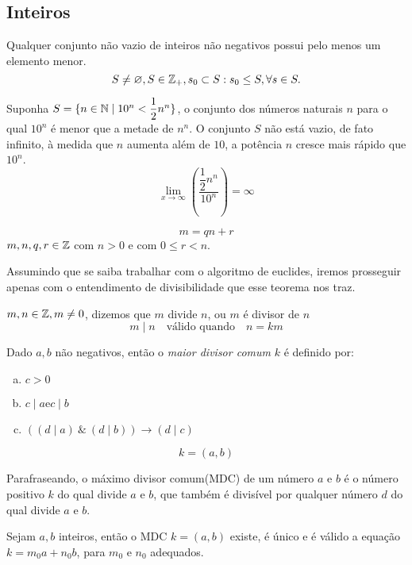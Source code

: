 \subsection{Inteiros}
\begin{definition}\label{PBO}
    Qualquer conjunto não vazio de inteiros não negativos possui  pelo menos um elemento menor.
    $$S\neq \varnothing, S \in \mathbb{Z}_+, s_{0} \subset S: s_{0} \leq S, \forall s \in S.$$
\begin{exmp}
    Suponha $S = \{n \in \mathbb{N} \mid 10^n < \dfrac{1}{2} n^n \}$, o conjunto dos números naturais $n$ para o qual $10^n$ é menor que a metade de $n^n$. O conjunto $S$ não está vazio, de fato infinito, à medida que $n$ aumenta além de $10$, a potência $n$ cresce mais rápido que $10^n$. $$ \lim_{x \to \infty}\left(\dfrac{\dfrac{1}{2} n^n}{10^n}\right) = \infty $$
\end{exmp}
\end{definition}
\begin{theorem}
    $$m = qn + r$$
    $m, n, q, r \in \mathbb{Z}$ com $n > 0$ e com $0 \leq r < n$.
\end{theorem}
Assumindo que se saiba trabalhar com o algoritmo de euclides, iremos prosseguir apenas com o entendimento de divisibilidade que esse teorema nos traz.
\begin{definition}
    $m, n \in \mathbb{Z}, m \neq 0$, dizemos que $m$ divide $n$, ou $m$ é divisor de $n$ $$m \mid n\quad \textrm{válido quando}\quad n = km$$
\end{definition} 
\begin{definition}
    Dado $a,b$ não negativos, então o \textit{maior divisor comum} $k$ é definido por: 
    \begin{enumerate}[(a)]
        \item $c>0$
        \item $c\mid a$\quad e\quad $c\mid b$
        \item $((d \mid a)\ \&\ (d\mid b)) \rightarrow (d\mid c)$
    \end{enumerate}
    $$k = (a,b)$$
\end{definition}
Parafraseando, o máximo divisor comum(MDC) de um número $a$ e $b$ é o número positivo $k$ do qual divide $a$ e $b$, que também é divisível por qualquer número $d$ do qual divide $a$ e $b$.
\begin{theorem}
    Sejam $a,b$ inteiros, então o MDC $k = (a,b)$ existe, é único e é válido a equação $k = m_{0}a + n_{0}b$, para $m_{0}$ e $n_{0}$ adequados.
\end{theorem}
